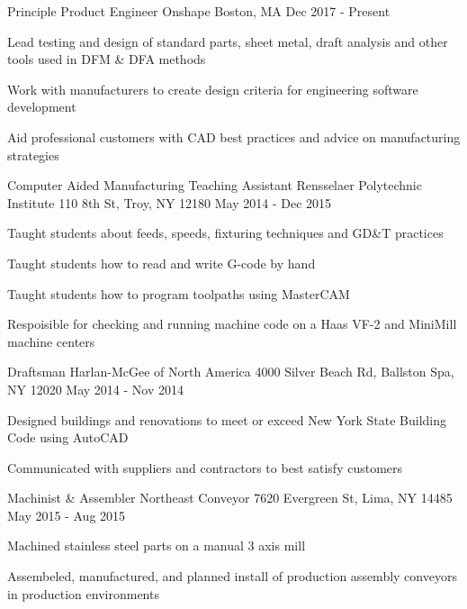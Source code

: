 \begin{cventries}
  \cventry
    {Principle Product Engineer} %
    {Onshape} %
    {Boston, MA} %
    {Dec 2017 - Present} %
    {
      \begin{cvitems} %
        \item {Lead testing and design of standard parts, sheet metal, draft analysis and other tools used in DFM \& DFA methods}
        \item {Work with manufacturers to create design criteria for engineering software development}
        \item {Aid professional customers with CAD best practices and advice on manufacturing strategies}
      \end{cvitems}
    }
  \cventry
    {Computer Aided Manufacturing Teaching Assistant} %
    {Rensselaer Polytechnic Institute} %
    {110 8th St, Troy, NY 12180} %
    {May 2014 - Dec 2015} %
    {
      \begin{cvitems} %
        \item {Taught students about feeds, speeds, fixturing techniques and GD\&T practices}
        \item {Taught students how to read and write G-code by hand}
        \item {Taught students how to program toolpaths using MasterCAM}
        \item {Respoisible for checking and running machine code on a Haas VF-2 and MiniMill machine centers}
      \end{cvitems}
    }
  \cventry
    {Draftsman} %
    {Harlan-McGee of North America} %
    {4000 Silver Beach Rd, Ballston Spa, NY 12020} %
    {May 2014 - Nov 2014} %
    {
      \begin{cvitems} %
        \item {Designed buildings and renovations to meet or exceed New York State Building Code using AutoCAD}
        \item {Communicated with suppliers and contractors to best satisfy customers}
      \end{cvitems}
    }
  \cventry
    {Machinist \& Assembler} %
    {Northeast Conveyor} %
    {7620 Evergreen St, Lima, NY 14485} %
    {May 2015 - Aug 2015} %
    {
      \begin{cvitems} %
        \item {Machined stainless steel parts on a manual 3 axis mill}
        \item {Assembeled, manufactured, and planned install of production assembly conveyors in production environments}
      \end{cvitems}
    }

\end{cventries}
